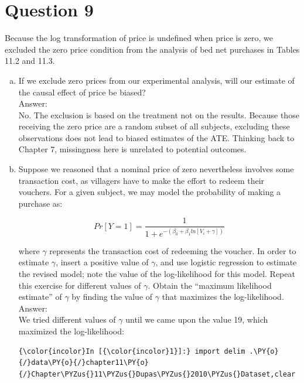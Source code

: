 \documentclass[11pt,notitlepage]{article}\usepackage[]{graphicx}\usepackage[]{color}
\makeatletter
\newenvironment{kframe}{%
 \def\at@end@of@kframe{}%
 \ifinner\ifhmode%
  \def\at@end@of@kframe{\end{minipage}}%
  \begin{minipage}{\columnwidth}%
 \fi\fi%
 \def\FrameCommand##1{\hskip\@totalleftmargin \hskip-\fboxsep
 \colorbox{shadecolor}{##1}\hskip-\fboxsep
     \hskip-\linewidth \hskip-\@totalleftmargin \hskip\columnwidth}%
 \MakeFramed {\advance\hsize-\width
   \@totalleftmargin\z@ \linewidth\hsize
   \@setminipage}}%
 {\par\unskip\endMakeFramed%
 \at@end@of@kframe}
\newenvironment{knitrout}{}{} %
\makeatother
\begin{document}
\section*{Question 9}
Because the log transformation of price is undefined when price is zero, we excluded the zero price condition from the analysis of bed net purchases in Tables 11.2 and 11.3.

\begin{enumerate}[a)]
\item If we exclude zero prices from our experimental analysis, will our estimate of the causal effect of price be biased?\\
Answer:\\
No. The exclusion is based on the treatment not on the results. Because those receiving the zero price are a random subset of all subjects, excluding these observations does not lead to biased estimates of the ATE. Thinking back to Chapter 7, missingness here is unrelated to potential outcomes.

\item Suppose we reasoned that a nominal price of zero nevertheless involves some transaction cost, as villagers have to make the effort to redeem their vouchers. For a given subject, we may model the probability of making a purchase as:

\begin{equation*}
Pr[Y=1] = \frac{1}{1 + e^{-(\beta_0+\beta_1 ln[V_i+\gamma])}}
\end{equation*}

where $\gamma$ represents the transaction cost of redeeming the voucher. In order to estimate $\gamma$, insert a positive value of $\gamma$, and use logistic regression to estimate the revised model; note the value of the log-likelihood for this model. Repeat this exercise for different values of $\gamma$. Obtain the ``maximum likelihood estimate'' of $\gamma$ by finding the value of $\gamma$ that maximizes the log-likelihood. \\
Answer:\\
We tried different values of $\gamma$ until we came upon the value 19, which maximized the log-likelihood:
\begin{knitrout}
\color{fgcolor}\begin{kframe}
    \begin{Verbatim}[commandchars=\\\{\}]
{\color{incolor}In [{\color{incolor}1}]:} import delim .\PY{o}{/}data\PY{o}{/}chapter11\PY{o}{/}Chapter\PYZus{}11\PYZus{}Dupas\PYZus{}2010\PYZus{}Dataset,clear
\end{Verbatim}


\end{kframe}
\end{knitrout}
\end{enumerate}
\end{document}
